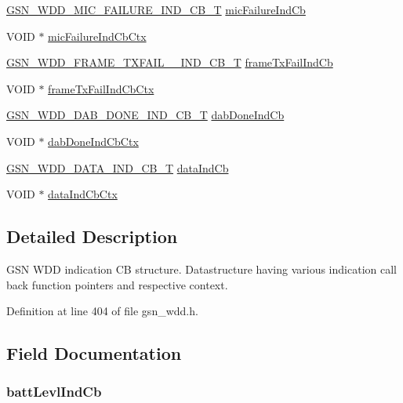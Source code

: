 \begin{DoxyCompactItemize}
\item 
\hyperlink{a00677_ga7ccb461a81661940f165a9e3d1812421}{GSN\_\-WDD\_\-MIC\_\-FAILURE\_\-IND\_\-CB\_\-T} \hyperlink{a00275_a2e567f3f2c794549fd6253b091fb1b45}{micFailureIndCb}
\item 
VOID $\ast$ \hyperlink{a00275_a1f02fbac1f62da7b5e47d5d6cadebdfa}{micFailureIndCbCtx}
\item 
\hyperlink{a00677_ga7e71a759def3d63d0aff2122a2b21bef}{GSN\_\-WDD\_\-FRAME\_\-TXFAIL\_\-\_\-IND\_\-CB\_\-T} \hyperlink{a00275_a941cb6f1436ce47003a3a1e67ff5d277}{frameTxFailIndCb}
\item 
VOID $\ast$ \hyperlink{a00275_a29f3d0e8f7ceb0ad9653a3693aa45a6c}{frameTxFailIndCbCtx}
\item 
\hyperlink{a00677_ga609ae39dc432b9821b764bea4957369a}{GSN\_\-WDD\_\-DAB\_\-DONE\_\-IND\_\-CB\_\-T} \hyperlink{a00275_a9561a7680057ec7e86acc06844a6d853}{dabDoneIndCb}
\item 
VOID $\ast$ \hyperlink{a00275_ab37d9fc294621353de782e21544b705b}{dabDoneIndCbCtx}
\item 
\hyperlink{a00603_a6ba5be1c4251a77b2a642319af4b696b}{GSN\_\-WDD\_\-DATA\_\-IND\_\-CB\_\-T} \hyperlink{a00275_aff40e5e9d6c800e4f64bf8323ba56375}{dataIndCb}
\item 
VOID $\ast$ \hyperlink{a00275_acd10b5776af09323cb2d95e3f5fa6d54}{dataIndCbCtx}
\end{DoxyCompactItemize}


\subsection{Detailed Description}
GSN WDD indication CB structure. Datastructure having various indication call back function pointers and respective context. 

Definition at line 404 of file gsn\_\-wdd.h.



\subsection{Field Documentation}
\hypertarget{a00275_a404015f695a8a45821269f2629ec01f6}{
\subsubsection[{battLevlIndCb}]{ {\bf battLevlIndCb}}}
\label{a00275_a404015f695a8a45821269f2629ec01f6}


